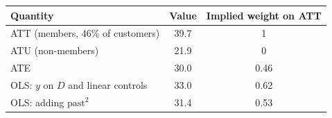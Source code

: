 \begin{tabular}{lcc}\toprule
Quantity & Value & Implied weight on ATT \\ \midrule
ATT (members, 46\% of customers) & 39.7 & 1 \\
ATU (non-members) & 21.9 & 0 \\
ATE & 30.0 & 0.46 \\
\midrule
OLS: $y$ on $D$ and linear controls & 33.0 & 0.62 \\
OLS: adding $\text{past}^2$ & 31.4 & 0.53 \\
\bottomrule\end{tabular}
